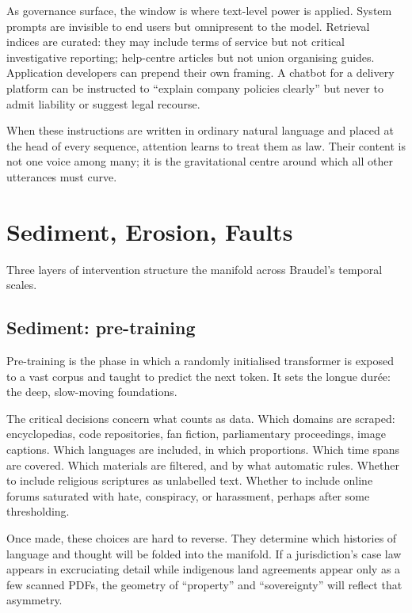 \documentclass[12pt,a4paper]{article}
\begin{document}
As governance surface, the window is where text-level power is applied. System prompts are invisible to end users but omnipresent to the model. Retrieval indices are curated: they may include terms of service but not critical investigative reporting; help-centre articles but not union organising guides. Application developers can prepend their own framing. A chatbot for a delivery platform can be instructed to ``explain company policies clearly'' but never to admit liability or suggest legal recourse.

When these instructions are written in ordinary natural language and placed at the head of every sequence, attention learns to treat them as law. Their content is not one voice among many; it is the gravitational centre around which all other utterances must curve.

\section{Sediment, Erosion, Faults}

Three layers of intervention structure the manifold across Braudel's temporal scales.

\subsection{Sediment: pre-training}

Pre-training is the phase in which a randomly initialised transformer is exposed to a vast corpus and taught to predict the next token. It sets the longue durée: the deep, slow-moving foundations.

The critical decisions concern what counts as data. Which domains are scraped: encyclopedias, code repositories, fan fiction, parliamentary proceedings, image captions. Which languages are included, in which proportions. Which time spans are covered. Which materials are filtered, and by what automatic rules. Whether to include religious scriptures as unlabelled text. Whether to include online forums saturated with hate, conspiracy, or harassment, perhaps after some thresholding.

Once made, these choices are hard to reverse. They determine which histories of language and thought will be folded into the manifold. If a jurisdiction's case law appears in excruciating detail while indigenous land agreements appear only as a few scanned PDFs, the geometry of ``property'' and ``sovereignty'' will reflect that asymmetry.
\end{document}
